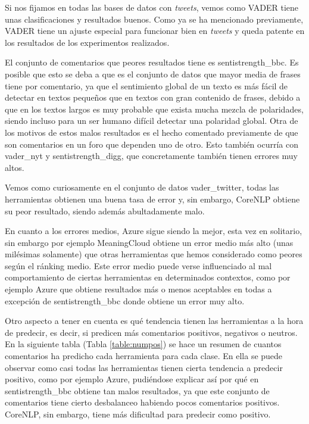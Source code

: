 Si nos fijamos en todas las bases de datos con \textit{tweets}, vemos como VADER tiene unas clasificaciones y resultados buenos. Como ya se ha mencionado previamente, VADER tiene un ajuste especial para funcionar bien en \textit{tweets} y queda patente en los resultados de los experimentos realizados.

El conjunto de comentarios que peores resultados tiene es sentistrength\_bbc. Es posible que esto se deba a que es el conjunto de datos que mayor media de frases tiene por comentario, ya que el sentimiento global de un texto es más fácil de detectar en textos pequeños que en textos con gran contenido de frases, debido a que en los textos largos es muy probable que exista mucha mezcla de polaridades, siendo incluso para un ser humano difícil detectar una polaridad global. Otra de los motivos de estos malos resultados es el hecho comentado previamente de que son comentarios en un foro que dependen uno de otro. Esto también ocurría con vader\_nyt y sentistrength\_digg, que concretamente también tienen errores muy altos.

Vemos como curiosamente en el conjunto de datos vader\_twitter, todas las herramientas obtienen una buena tasa de error y, sin embargo, CoreNLP obtiene su peor resultado, siendo además abultadamente malo.

En cuanto a los errores medios, Azure sigue siendo la mejor, esta vez en solitario, sin embargo por ejemplo MeaningCloud obtiene un error medio más alto (unas milésimas solamente) que otras herramientas que hemos considerado como peores según el ránking medio. Este error medio puede verse influenciado al mal comportamiento de ciertas herramientas en determinados contextos, como por ejemplo Azure que obtiene resultados más o menos aceptables en todas a excepción de sentistrength\_bbc donde obtiene un error muy alto.

Otro aspecto a tener en cuenta es qué tendencia tienen las herramientas a la hora de predecir, es decir, si predicen más comentarios positivos, negativos o neutros. En la siguiente tabla (Tabla \ref{table:numpos}) se hace un resumen de cuantos comentarios ha predicho cada herramienta para cada clase. En ella se puede observar como casi todas las herramientas tienen cierta tendencia a predecir positivo, como por ejemplo Azure, pudiéndose explicar así por qué en sentistrength\_bbc obtiene tan malos resultados, ya que este conjunto de comentarios tiene cierto desbalanceo habiendo pocos comentarios positivos. CoreNLP, sin embargo, tiene más dificultad para predecir como positivo.

